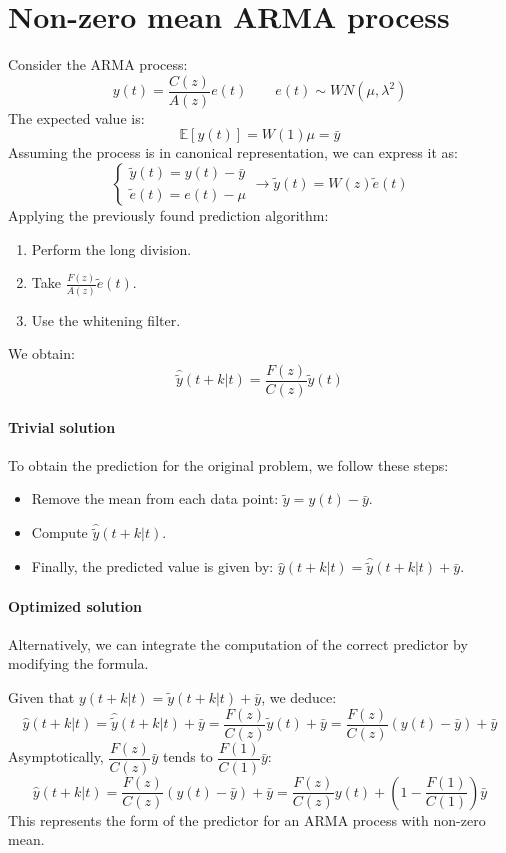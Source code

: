 \section{Non-zero mean ARMA process}

Consider the ARMA process:
\[y(t)=\dfrac{C(z)}{A(z)}e(t) \qquad e(t)\sim WN(\mu,\lambda^2)\]
The expected value is:
\[\mathbb{E}\left[y(t)\right]=W(1)\mu=\bar{y}\]
Assuming the process is in canonical representation, we can express it as:
\[\begin{cases}
    \tilde{y}(t)=y(t)-\bar{y} \\
    \tilde{e}(t)=e(t)-\mu 
\end{cases} \rightarrow \tilde{y}(t)=W(z)\tilde{e}(t)\]
Applying the previously found prediction algorithm:
\begin{enumerate}
    \item Perform the long division.
    \item Take $\frac{F(z)}{A(z)}\tilde{e}(t)$. 
    \item Use the whitening filter.
\end{enumerate}
We obtain:
\[\hat{\tilde{y}}(t+k|t)=\dfrac{F(z)}{C(z)}\tilde{y}(t)\]

\paragraph*{Trivial solution}
To obtain the prediction for the original problem, we follow these steps:
\begin{itemize}
    \item Remove the mean from each data point: $\tilde{y}=y(t)-\bar{y}$. 
    \item Compute $\hat{\tilde{y}}(t+k|t)$. 
    \item Finally, the predicted value is given by: $\hat{y}(t+k|t)=\hat{\tilde{y}}(t+k|t)+\bar{y}$.
\end{itemize}

\paragraph*{Optimized solution}
Alternatively, we can integrate the computation of the correct predictor by modifying the formula.

Given that $y(t+k|t)=\tilde{y}(t+k|t)+\bar{y}$, we deduce:
\[\hat{y}(t+k|t)=\hat{\tilde{y}}(t+k|t)+\bar{y}=\dfrac{F(z)}{C(z)}\tilde{y}(t)+\bar{y}=\dfrac{F(z)}{C(z)}(y(t)-\bar{y})+\bar{y} \]
Asymptotically, $\dfrac{F(z)}{C(z)}\bar{y}$ tends to $\dfrac{F(1)}{C(1)}\bar{y}$:
\[\hat{y}(t+k|t)=\dfrac{F(z)}{C(z)}(y(t)-\bar{y})+\bar{y}=\dfrac{F(z)}{C(z)}y(t) + \left(1-\dfrac{F(1)}{C(1)}\right)\bar{y}\]
This represents the form of the predictor for an ARMA process with non-zero mean.